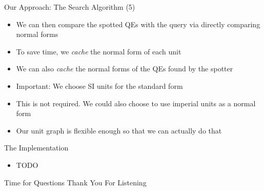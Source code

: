\documentclass{beamer}
\begin{document}
  \begin{frame}{Our Approach: The Search Algorithm (5)}
    \begin{itemize}[<+->]
      \item We can then compare the spotted QEs with the query via directly comparing normal forms
      \item To save time, we \textit{cache} the normal form of each unit
      \item We can also \textit{cache} the normal forms of the QEs found by the spotter
      \item Important: We choose SI units for the standard form
      \item This is not required. We could also choose to use imperial units as a normal form
      \item Our unit graph is flexible enough so that we can actually do that
    \end{itemize}
  \end{frame}

  \begin{frame}{The Implementation}
    \begin{itemize}[<+->]
      \item TODO
    \end{itemize}
  \end{frame}

  \begin{frame}{Time for Questions}
    \huge{Thank You For Listening}
  \end{frame}

\end{document}
